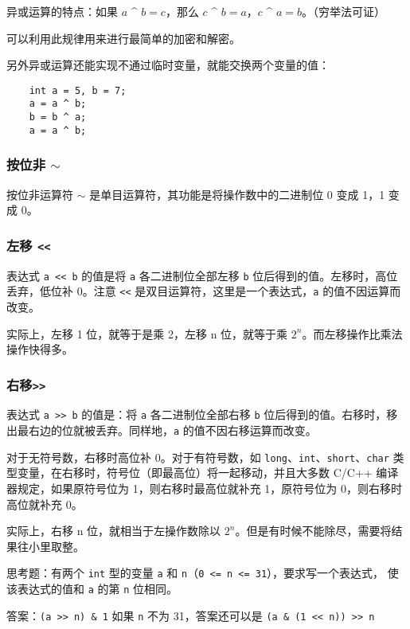 \documentclass[UTF8]{ctexart}
\begin{document}
异或运算的特点：如果 $a$ \^{} $b = c$，那么 $c$ \^{} $b = a$，$c$ \^{} $a = b$。（穷举法可证）

可以利用此规律用来进行最简单的加密和解密。

另外异或运算还能实现不通过临时变量，就能交换两个变量的值：
\begin{verbatim}
    int a = 5, b = 7;
    a = a ^ b;
    b = b ^ a;
    a = a ^ b;
\end{verbatim}

\subsubsection{按位非 \texttt{$\sim$}}
按位非运算符 \texttt{$\sim$} 是单目运算符，其功能是将操作数中的二进制位 0 变成 1，1 变成 0。

\subsubsection{左移 \texttt{<<}}
表达式 \texttt{a << b} 的值是将 \texttt{a} 各二进制位全部左移 \texttt{b} 位后得到的值。左移时，高位
丢弃，低位补 0。注意 \texttt{<<} 是双目运算符，这里是一个表达式，\texttt{a} 的值不因运算而改变。

实际上，左移 1 位，就等于是乘 2，左移 n 位，就等于乘 $2^n$。而左移操作比乘法操作快得多。

\subsubsection{右移\texttt{>>}}
表达式 \texttt{a >> b} 的值是：将 \texttt{a} 各二进制位全部右移 \texttt{b} 位后得到的值。右移时，移
出最右边的位就被丢弃。同样地，\texttt{a} 的值不因右移运算而改变。

对于无符号数，右移时高位补 0。对于有符号数，如 \texttt{long}、\texttt{int}、\texttt{short}、\texttt{char}
类型变量，在右移时，符号位（即最高位）将一起移动，并且大多数 C/C++ 编译器规定，如果原符号位为 1，则右移时最高位就补充
1，原符号位为 0，则右移时高位就补充 0。

实际上，右移 n 位，就相当于左操作数除以 $2^n$。但是有时候不能除尽，需要将结果往小里取整。

思考题：有两个 \texttt{int} 型的变量 \texttt{a} 和 \texttt{n}（\texttt{0 <= n <= 31}），要求写一个表达式，
使该表达式的值和 \texttt{a} 的第 \texttt{n} 位相同。

答案：\texttt{(a >> n) & 1} \qquad 如果 \texttt{n} 不为 31，答案还可以是
\texttt{(a & (1 << n)) >> n}
\end{document}
